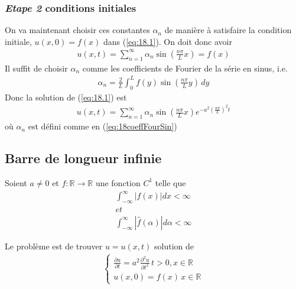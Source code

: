 \subsubsection{\emph{Etape 2} conditions initiales}
On va maintenant choisir ces constantes $\alpha_n$ de manière à satisfaire la condition initiale, $u(x,0)=f(x)$ dans (\ref{eq:18.1}). On doit donc avoir
\begin{eqnarray}
	u(x,t)=\sum_{n=1}^\infty\alpha_n\sin{(\frac{n\pi}{L}x)}=f(x)
\end{eqnarray}
Il suffit de choisir $\alpha_n$ comme les coefficients de Fourier de la série en sinus, i.e.
\begin{eqnarray}
	\label{eq:18coeffFourSin}
	\alpha_n=\frac{2}{L}\int_0^Lf(y)\sin{(\frac{n\pi}{L}y)}\,dy 
\end{eqnarray}
Donc la solution de (\ref{eq:18.1}) est
\begin{eqnarray}
	u(x,t)=\sum_{n=1}^\infty\alpha_n\sin{(\frac{n\pi}{L}x)}e^{-a^2(\frac{n\pi}{L})^2t} 
\end{eqnarray} 
où $\alpha_n$ est défini comme en (\ref{eq:18coeffFourSin})

\subsection{Barre de longueur infinie}
Soient $a\neq0$ et $f:\mathbb R\rightarrow\mathbb R$ une fonction $C^1$ telle que
\begin{eqnarray*}
	\int_{-\infty}^{\infty}|f(x)|dx<\infty
	\\
	et
	\\
	\int_{-\infty}^{\infty}|\hat f(\alpha)|d\alpha<\infty
\end{eqnarray*}

Le problème est de trouver $u=u(x,t)$ solution de
\begin{eqnarray}
	\label{eq:18.5}
	\begin{cases}
		\frac{\partial u}{\partial t}=a^2\frac{\partial^2u}{\partial t^2}\,t>0,x\in\mathbb R
		\\
		u(x,0)=f(x)\,x\in\mathbb R
	\end{cases}
\end{eqnarray}

